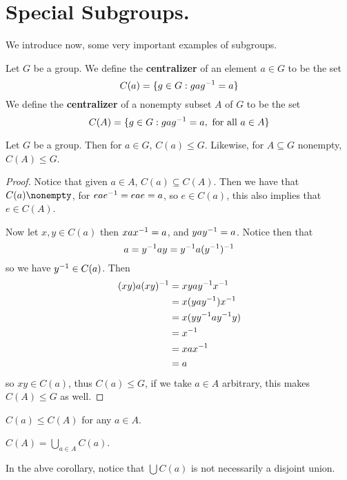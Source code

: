 \section{Special Subgroups.}
\label{section_2.2}

We introduce now, some very important examples of subgroups.

\begin{definition}
  Let $G$ be a group. We define the \textbf{centralizer} of an element $a \in
  G$ to be the set
  \begin{equation*}
    C(a)=\{g \in G: gag^{-1}=a\}
  \end{equation*}
  We define the
  \textbf{centralizer} of a nonempty subset $A$ of  $G$ to be the set
  \begin{equation*}
    C(A)=\{g \in G : gag^{-1}=a, \text{ for all } a \in A\}
  \end{equation*}
\end{definition}

\begin{lemma}\label{lemma_2.2.1}
  Let $G$ be a group. Then for  $a \in G$,  $C(a) \leq G$. Likewise, for $A
  \subseteq G$ nonempty, $C(A) \leq G$.
\end{lemma}
\begin{proof}
  Notice that given $a \in A$,  $C(a) \subseteq C(A)$. Then we have that $C(a)
  \nonempty$, for $eae^{-1}=eae=a$, so $e \in C(a)$, this also implies that
  $e \in C(A)$.

  Now let $x,y \in C(a)$ then $xax^{-1}=a$, and $yay^{-1}=a$. Notice then
  that
  \begin{equation*}
    a=y^{-1}ay=y^{-1}a(y^{-1})^{-1}
  \end{equation*}
  so we have $y^{-1} \in C(a)$.
  Then
  \begin{align*}
    (xy)a(xy)^{-1} &=  xyay^{-1}x^{-1} \\
                    &=  x(yay^{-1})x^{-1} \\
                    &=  x(yy^{-1}ay^{-1}y)  \\
                    &=  x^{-1} \\
                    &=  xax^{-1} \\
                    &=  a
  \end{align*}
  so $xy \in C(a)$, thus $C(a) \leq G$, if we take $a
  \in A$ arbitrary, this makes  $C(A) \leq G$ as well.
\end{proof}
\begin{corollary}
  $C(a) \leq C(A)$ for any $a \in A$.
\end{corollary}
\begin{corollary}
  $C(A)=\bigcup_{a \in A}{C(a)}$.
\end{corollary}
\begin{remark}
  In the abve corollary, notice that $\bigcup{C(a)}$ is not necessarily a
  disjoint union.
\end{remark}

